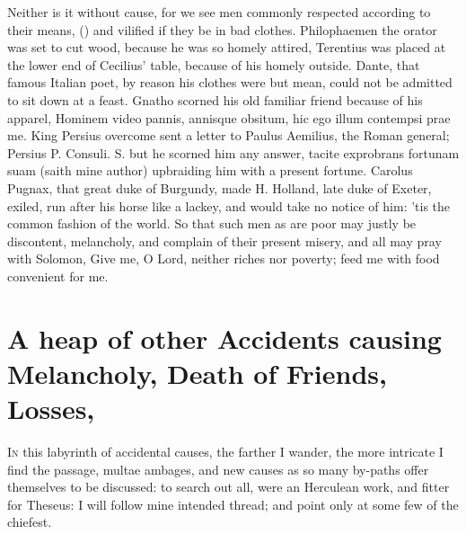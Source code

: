 {{Neither is it without cause, for we see men commonly respected
according to their means, () and vilified if they be in bad clothes. Philophaemen the
orator was set to cut wood, because he was so homely attired,
Terentius was placed at the lower end of Cecilius' table, because
of his homely outside.  Dante, that famous Italian poet, by
reason his clothes were but mean, could not be admitted to sit down at
a feast. Gnatho scorned his old familiar friend because of his apparel,
Hominem video pannis, annisque obsitum, hic ego illum contempsi
prae me. King Persius overcome sent a letter to Paulus Aemilius,
the Roman general; Persius P. Consuli. S. but he scorned him any
answer, tacite exprobrans fortunam suam (saith mine author) upbraiding
him with a present fortune. Carolus Pugnax, that great duke of
Burgundy, made H. Holland, late duke of Exeter, exiled, run after his
horse like a lackey, and would take no notice of him:  'tis the
common fashion of the world. So that such men as are poor may justly be
discontent, melancholy, and complain of their present misery, and all
may pray with Solomon, Give me, O Lord, neither riches nor
poverty; feed me with food convenient for me.

\section[Accidents, Death of Friends, Losses]{A heap of other Accidents causing Melancholy, Death of Friends, Losses, \etc{}}\label{sec:accidents-death-of-friends}

\lettrine{I}{n} this labyrinth of accidental causes, the farther I wander, the more
intricate I find the passage, multae ambages, and new causes as so many
by-paths offer themselves to be discussed: to search out all, were an
Herculean work, and fitter for Theseus: I will follow mine intended
thread; and point only at some few of the chiefest.
}}
